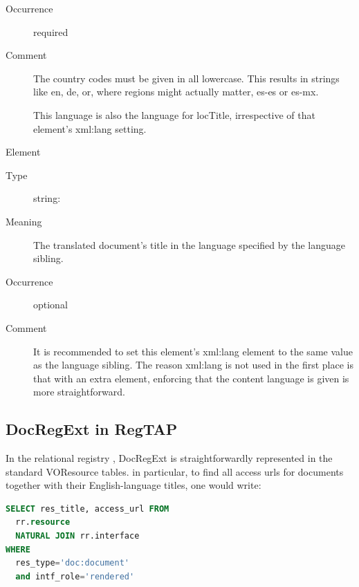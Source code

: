 \documentclass{ivoa}
\begin{document}
\begin{generated}
\begin{bigdescription}
\begin{description}
\item[Occurrence] required
\item[Comment] 
                The country codes must be given in all lowercase.  This
                results in strings like en, de, or, where regions
                might actually matter, es-es or es-mx.

                This language is also the language for locTitle, 
                irrespective of that element's xml:lang setting.
              

\end{description}
\item[Element \xmlel{locTitle}]
\begin{description}
\item[Type] string: 
\item[Meaning] 
              	The translated document's title in the language specified
              	by the language sibling.
            	
\item[Occurrence] optional
\item[Comment] 
              	It is recommended to set this element's xml:lang element
              	to the same value as the language sibling.  The reason
              	xml:lang is not used in the first place is that with an
              	extra element, enforcing that the content language is
              	given is more straightforward.
              

\end{description}


\end{bigdescription}\endgroup

\endgroup
\end{generated}


\subsection{DocRegExt in RegTAP}
\label{sect:docregext-regtap}

In the relational registry \citep{2014ivoa.spec.1208D}, DocRegExt is
straightforwardly represented in the standard VOResource tables.  in
particular, to find all access urls for documents together with their
English-language titles, one would write:

\begin{lstlisting}[language=SQL]
SELECT res_title, access_url FROM
  rr.resource 
  NATURAL JOIN rr.interface
WHERE
  res_type='doc:document'
  and intf_role='rendered'
\end{lstlisting}
\end{document}
